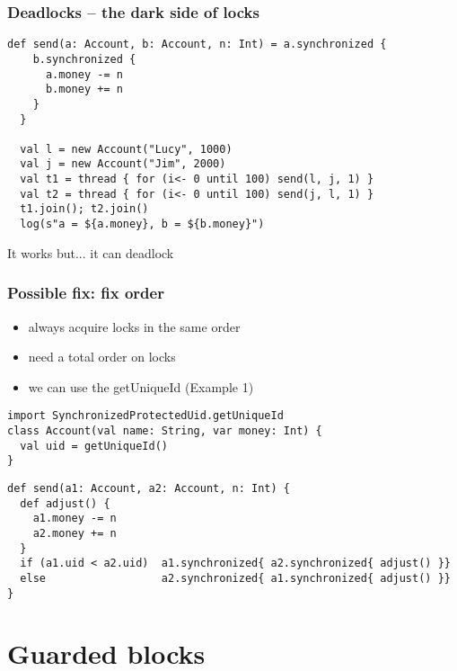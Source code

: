 \documentclass[aspectratio=169]{beamer}
\begin{document}
\begin{frame}[fragile]\frametitle{Deadlocks -- the dark side of locks}
\begin{lstlisting}[emph={assert,sleep,log,thread,join,synchronized}]
  def send(a: Account, b: Account, n: Int) = a.synchronized {
    b.synchronized {
      a.money -= n
      b.money += n
    }
  }

  val l = new Account("Lucy", 1000)
  val j = new Account("Jim", 2000)
  val t1 = thread { for (i<- 0 until 100) send(l, j, 1) }
  val t2 = thread { for (i<- 0 until 100) send(j, l, 1) }
  t1.join(); t2.join()
  log(s"a = ${a.money}, b = ${b.money}")
\end{lstlisting}

{\Large \pause It works but... \pause \alert{it can deadlock}}
\end{frame}


\begin{frame}[fragile]\frametitle{Possible fix: fix order}

\begin{itemize}
  \item always acquire locks in the same order
  \item need a total order on locks
  \item we can use the getUniqueId (Example 1)
\end{itemize}
    
\begin{lstlisting}[emph={getUniqueId,sleep,log,thread,join,synchronized}]
import SynchronizedProtectedUid.getUniqueId
class Account(val name: String, var money: Int) {
  val uid = getUniqueId()
}
\end{lstlisting}
\pause
\begin{lstlisting}[emph={assert,sleep,log,thread,join,synchronized}]
def send(a1: Account, a2: Account, n: Int) {
  def adjust() {
    a1.money -= n
    a2.money += n
  }
  if (a1.uid < a2.uid)  a1.synchronized{ a2.synchronized{ adjust() }}
  else                  a2.synchronized{ a1.synchronized{ adjust() }}
}
\end{lstlisting}
\end{frame}

\section{Guarded blocks}
\end{document}
